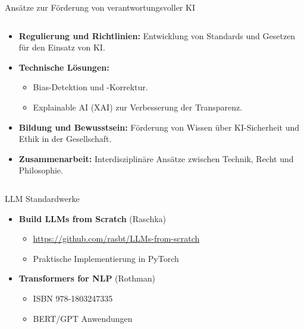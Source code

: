 \documentclass[aspectratio=1610, xcolor=dvipsnames, 9pt]{beamer}
\begin{document}
\begin{frame}{Ansätze zur Förderung von verantwortungsvoller KI}
  \begin{columns}
    \begin{column}{1\textwidth}
      \begin{itemize}
        \item \textbf{Regulierung und Richtlinien:} Entwicklung von Standards und Gesetzen für den Einsatz von KI.
        \item \textbf{Technische Lösungen:} 
          \begin{itemize}
            \item Bias-Detektion und -Korrektur.
            \item Explainable AI (XAI) zur Verbesserung der Transparenz. 
          \end{itemize}
        \item \textbf{Bildung und Bewusstsein:} Förderung von Wissen über KI-Sicherheit und Ethik in der Gesellschaft.
        \item \textbf{Zusammenarbeit:} Interdisziplinäre Ansätze zwischen Technik, Recht und Philosophie.
      \end{itemize}
    \end{column}
  \end{columns}
\end{frame}


\begin{frame}{LLM Standardwerke}
\begin{itemize}
\item \textbf{Build LLMs from Scratch} (Raschka)
\begin{itemize}
\item \url{https://github.com/rasbt/LLMs-from-scratch}
\item Praktische Implementierung in PyTorch
\end{itemize}

\item \textbf{Transformers for NLP} (Rothman)
\begin{itemize}
\item ISBN 978-1803247335
\item BERT/GPT Anwendungen
\end{itemize}
\end{itemize}
\end{frame}
\end{document}
